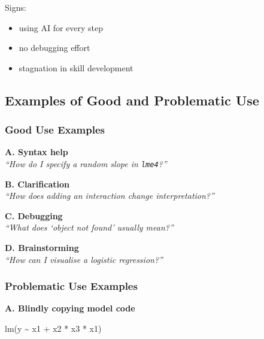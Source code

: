 \documentclass[
  letterpaper,
  8pt,
  a4paper]{book}
\newenvironment{Shaded}{\begin{snugshade}}{\end{snugshade}}
\newcommand{\FunctionTok}[1]{\textcolor[rgb]{0.28,0.35,0.67}{#1}}
\newcommand{\NormalTok}[1]{\textcolor[rgb]{0.00,0.23,0.31}{#1}}
\newcommand{\SpecialCharTok}[1]{\textcolor[rgb]{0.37,0.37,0.37}{#1}}
\providecommand{\tightlist}{%
  \setlength{\itemsep}{0pt}\setlength{\parskip}{0pt}}
\begin{document}
Signs:

\begin{itemize}
\tightlist
\item
  using AI for every step\\
\item
  no debugging effort\\
\item
  stagnation in skill development
\end{itemize}

\subsection*{Examples of Good and Problematic
Use}\label{examples-of-good-and-problematic-use}

\subsubsection*{Good Use Examples}\label{good-use-examples}

\textbf{A. Syntax help}\\
\emph{``How do I specify a random slope in \texttt{lme4}?''}

\textbf{B. Clarification}\\
\emph{``How does adding an interaction change interpretation?''}

\textbf{C. Debugging}\\
\emph{``What does `object not found' usually mean?''}

\textbf{D. Brainstorming}\\
\emph{``How can I visualise a logistic regression?''}

\subsubsection*{Problematic Use
Examples}\label{problematic-use-examples}

\textbf{A. Blindly copying model code}

\begin{Shaded}
\begin{Highlighting}[]
\FunctionTok{lm}\NormalTok{(y }\SpecialCharTok{\textasciitilde{}}\NormalTok{ x1 }\SpecialCharTok{+}\NormalTok{ x2 }\SpecialCharTok{*}\NormalTok{ x3 }\SpecialCharTok{*}\NormalTok{ x1)}
\end{Highlighting}
\end{Shaded}
\end{document}
